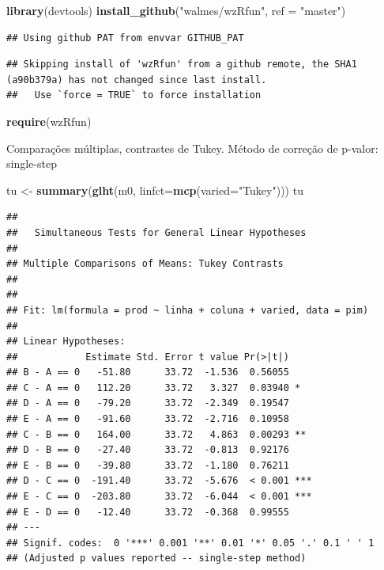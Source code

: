 \documentclass[
]{book}
\newenvironment{Shaded}{\begin{snugshade}}{\end{snugshade}}
\newcommand{\DataTypeTok}[1]{\textcolor[rgb]{0.13,0.29,0.53}{#1}}
\newcommand{\KeywordTok}[1]{\textcolor[rgb]{0.13,0.29,0.53}{\textbf{#1}}}
\newcommand{\NormalTok}[1]{#1}
\newcommand{\StringTok}[1]{\textcolor[rgb]{0.31,0.60,0.02}{#1}}
\begin{document}
\begin{Shaded}
\begin{Highlighting}[]
\KeywordTok{library}\NormalTok{(devtools) }
\KeywordTok{install_github}\NormalTok{(}\StringTok{"walmes/wzRfun"}\NormalTok{, }\DataTypeTok{ref =} \StringTok{"master"}\NormalTok{) }
\end{Highlighting}
\end{Shaded}

\begin{verbatim}
## Using github PAT from envvar GITHUB_PAT
\end{verbatim}

\begin{verbatim}
## Skipping install of 'wzRfun' from a github remote, the SHA1 (a90b379a) has not changed since last install.
##   Use `force = TRUE` to force installation
\end{verbatim}

\begin{Shaded}
\begin{Highlighting}[]
\KeywordTok{require}\NormalTok{(wzRfun)}
\end{Highlighting}
\end{Shaded}

Comparações múltiplas, contrastes de Tukey. Método de correção de p-valor: single-step

\begin{Shaded}
\begin{Highlighting}[]
\NormalTok{tu <-}\StringTok{ }\KeywordTok{summary}\NormalTok{(}\KeywordTok{glht}\NormalTok{(m0, }\DataTypeTok{linfct=}\KeywordTok{mcp}\NormalTok{(}\DataTypeTok{varied=}\StringTok{"Tukey"}\NormalTok{))) }
\NormalTok{tu}
\end{Highlighting}
\end{Shaded}

\begin{verbatim}
## 
##   Simultaneous Tests for General Linear Hypotheses
## 
## Multiple Comparisons of Means: Tukey Contrasts
## 
## 
## Fit: lm(formula = prod ~ linha + coluna + varied, data = pim)
## 
## Linear Hypotheses:
##            Estimate Std. Error t value Pr(>|t|)    
## B - A == 0   -51.80      33.72  -1.536  0.56055    
## C - A == 0   112.20      33.72   3.327  0.03940 *  
## D - A == 0   -79.20      33.72  -2.349  0.19547    
## E - A == 0   -91.60      33.72  -2.716  0.10958    
## C - B == 0   164.00      33.72   4.863  0.00293 ** 
## D - B == 0   -27.40      33.72  -0.813  0.92176    
## E - B == 0   -39.80      33.72  -1.180  0.76211    
## D - C == 0  -191.40      33.72  -5.676  < 0.001 ***
## E - C == 0  -203.80      33.72  -6.044  < 0.001 ***
## E - D == 0   -12.40      33.72  -0.368  0.99555    
## ---
## Signif. codes:  0 '***' 0.001 '**' 0.01 '*' 0.05 '.' 0.1 ' ' 1
## (Adjusted p values reported -- single-step method)
\end{verbatim}
\end{document}
